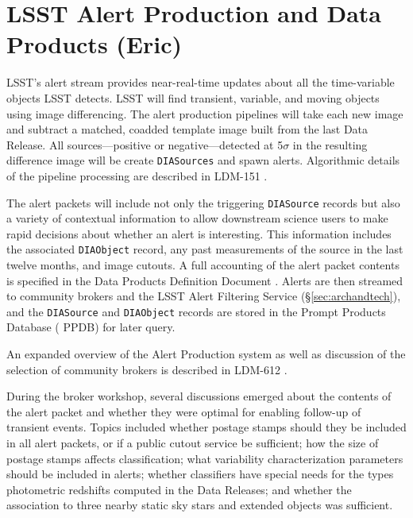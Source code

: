 \section{LSST Alert Production and Data Products (Eric)} \label{sec:alertproduction}

LSST's alert stream provides near-real-time updates about all the time-variable objects  {LSST} detects.
LSST will find transient, variable, and moving objects using image differencing.
The alert production pipelines will take each new image and subtract a matched, coadded template image built from the last Data Release.
All sources---positive or negative---detected at 5$\sigma$ in the resulting difference image will be create \texttt{DIASources} and spawn alerts.  
Algorithmic details of the pipeline processing are described in LDM-151 \citep{LDM-151}.

The alert packets will include not only the triggering \texttt{DIASource} records but also a variety of contextual information to allow downstream science users to make rapid decisions about whether an alert is interesting.
This information includes the associated \texttt{DIAObject} record, any past measurements of the source in the last twelve months, and image cutouts.  
A full accounting of the alert packet contents is specified in the Data Products Definition  {Document} \citep{LSE-163}.
Alerts are then streamed to community brokers and the  {LSST}  {Alert} Filtering Service (\S \ref{sec:archandtech}), and the \texttt{DIASource} and \texttt{DIAObject} records are stored in the Prompt Products Database ( {PPDB}) for later query.

An expanded overview of the Alert Production system as well as discussion of the selection of community brokers is described in   {LDM}-612 \citep{LDM-612}.

During the broker workshop, several discussions emerged about the contents of the alert packet and whether they were optimal for enabling follow-up of  {transient} events.
Topics included whether postage stamps should they be included in all alert packets, or if a public cutout service be sufficient; how the size of postage stamps affects classification; what variability characterization parameters should be included in alerts; whether classifiers have special needs for the types photometric redshifts computed in the Data Releases; and whether the association to three nearby static sky stars and extended objects was sufficient.

